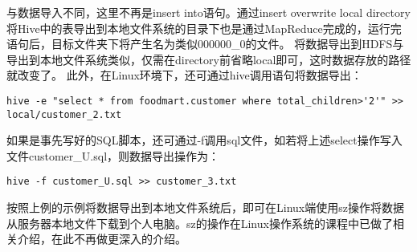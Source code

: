 与数据导入不同，这里不再是insert into语句。通过insert overwrite local
directory将Hive中的表导出到本地文件系统的目录下也是通过MapReduce完成的，运行完语句后，目标文件夹下将产生名为类似000000\_0的文件。
将数据导出到HDFS与导出到本地文件系统类似，仅需在directory前省略local即可，这时数据存放的路径就改变了。
此外，在Linux环境下，还可通过hive调用语句将数据导出：

\begin{lstlisting}
hive -e "select * from foodmart.customer where total_children>'2'" >> local/customer_2.txt
\end{lstlisting}

如果是事先写好的SQL脚本，还可通过-f调用sql文件，如若将上述select操作写入文件customer\_U.sql，则数据导出操作为：

\begin{lstlisting}
hive -f customer_U.sql >> customer_3.txt
\end{lstlisting}

按照上例的示例将数据导出到本地文件系统后，即可在Linux端使用sz操作将数据从服务器本地文件下载到个人电脑。sz的操作在Linux操作系统的课程中已做了相关介绍，在此不再做更深入的介绍。
